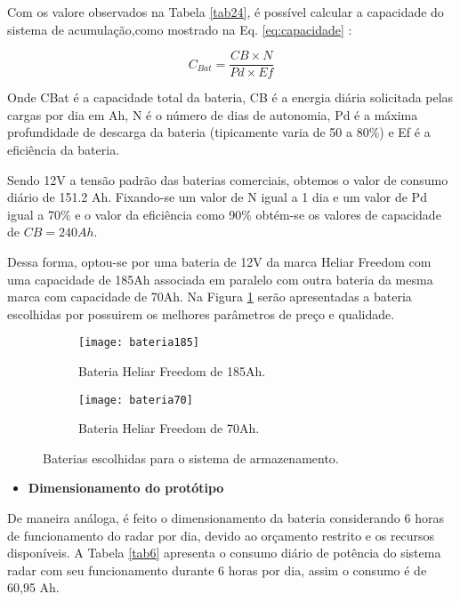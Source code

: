 Com os valore observados na Tabela \ref{tab24}, é possível calcular a capacidade do sistema de acumulação,como mostrado na Eq. \ref{eq:capacidade} \cite{alan}:

\begin{equation}
    C_{Bat} = \frac{CB \times N}{Pd \times Ef}
    \label{eq:capacidade}
\end{equation}


Onde CBat é a capacidade total da bateria, CB é a energia diária solicitada pelas cargas por dia em Ah, N é o número de dias de autonomia, Pd é a máxima profundidade de descarga da bateria (tipicamente varia de 50 a 80\%) e Ef é a eficiência da bateria.

Sendo 12V a tensão padrão das baterias comerciais, obtemos o valor de consumo diário de 151.2 Ah. Fixando-se um valor de N igual a 1 dia e um valor de Pd igual a 70\% e o valor da eficiência como 90\% obtém-se os valores de capacidade de $CB = 240 Ah$. 

Dessa forma, optou-se por uma bateria de 12V da marca Heliar Freedom com uma capacidade de 185Ah associada em paralelo com outra bateria da mesma marca com capacidade de 70Ah. Na Figura \ref{fig:bateria} serão apresentadas a bateria escolhidas por possuirem os melhores parâmetros de preço e qualidade.


\begin{figure}[h]

    \centering
      \begin{subfigure}{0.45\textwidth}
        \texttt{[image: bateria185]}
        \caption{Bateria Heliar Freedom de 185Ah.}
      \end{subfigure}
      \hfill
      \begin{subfigure}{0.35\textwidth}
        \texttt{[image: bateria70]}
        \caption{Bateria Heliar Freedom de 70Ah.}
      \end{subfigure}
    \caption{Baterias escolhidas para o sistema de armazenamento.}
    \label{fig:bateria}
\end{figure}


    \begin{itemize}
        \item \textbf{Dimensionamento do protótipo}
    \end{itemize}
    
    De maneira análoga, é feito o dimensionamento da bateria considerando 6 horas de funcionamento do radar por dia, devido ao orçamento restrito e os recursos disponíveis. A Tabela \ref{tab6} apresenta o consumo diário de potência do sistema radar com seu funcionamento durante 6 horas por dia, assim o consumo é de 60,95 Ah.
 
